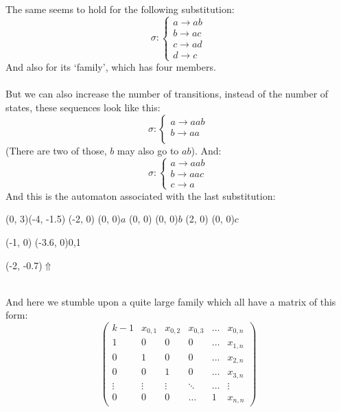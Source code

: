 \documentclass{article}
\begin{document}
The same seems to hold for the following substitution:
\begin{displaymath}
\sigma: \left\{ \begin{array}{l}
a \rightarrow ab\\
b \rightarrow ac\\
c \rightarrow ad\\
d \rightarrow c
\end{array} \right.
\end{displaymath}
And also for its `family', which has four members.\\
\\
But we can also increase the number of transitions, instead of the number of
states, these sequences look like this:\\
\begin{displaymath}
\sigma: \left\{ \begin{array}{l}
a \rightarrow aab\\
b \rightarrow aa\\
\end{array} \right.
\end{displaymath}
(There are two of those, $b$ may also go to $ab$). And:
\begin{displaymath}
\sigma: \left\{ \begin{array}{l}
a \rightarrow aab\\
b \rightarrow aac\\
c \rightarrow a
\end{array} \right.
\end{displaymath}
And this is the automaton associated with the last substitution:\\
\begin{graph}(0, 3)(-4, -1.5)
  (-2, 0) (0, 0){$a$}
  (0, 0)  (0, 0){$b$}
  (2, 0)  (0, 0){$c$}

  (-1, 0) \freetext(-3.6, 0){0,1}
   
   
   
   

  \freetext(-2, -0.7){$\Uparrow$}
\end{graph}\\
And here we stumble upon a quite large family which all have a matrix of this 
form:
\begin{displaymath}
\left( \begin{array}{cccccc}
k - 1 & x_{0, 1} & x_{0, 2} & x_{0, 3} & \ldots & x_{0, n}\\
1 & 0 & 0 & 0 & \ldots & x_{1, n}\\
0 & 1 & 0 & 0 & \ldots & x_{2, n}\\
0 & 0 & 1 & 0 & \ldots & x_{3, n}\\
\vdots & \vdots & \vdots & \ddots & \ldots & \vdots\\
0 & 0 & 0 & \ldots & 1 & x_{n, n}
\end{array} \right)
\end{displaymath}
\end{document}
